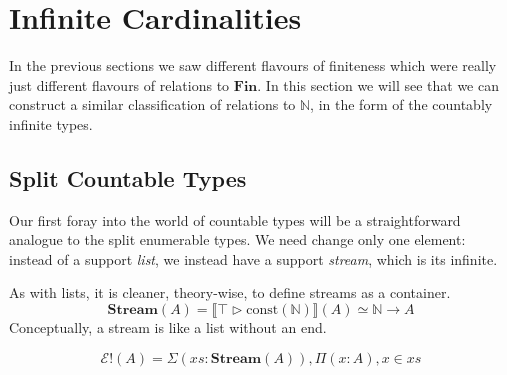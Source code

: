 \section{Infinite Cardinalities} \label{infinite-cardinalities}
In the previous sections we saw different flavours of finiteness which were
really just different flavours of relations to \(\mathbf{Fin}\).
In this section we will see that we can construct a similar classification of
relations to \(\mathbb{N}\), in the form of the countably infinite types.
\subsection{Split Countable Types}
Our first foray into the world of countable types will be a straightforward
analogue to the split enumerable types.
We need change only one element: instead of a support \emph{list}, we instead
have a support \emph{stream}, which is its infinite.
\begin{rm-definition}[Stream]
  As with lists, it is cleaner, theory-wise, to define streams as a container.
  \begin{equation}
    \mathbf{Stream}(A) = \llbracket \top \triangleright \text{const} (\mathbb{N}) \rrbracket(A) \simeq \mathbb{N} \rightarrow A
  \end{equation}
  Conceptually, a stream is like a list without an end.
\end{rm-definition}
\begin{rm-definition}
  \begin{equation}
    \mathcal{E}!(A) = \Sigma {(\mathit{xs} : \mathbf{Stream}(A))} , \Pi {(x : A)} , x \in \mathit{xs}
  \end{equation}
\end{rm-definition}
